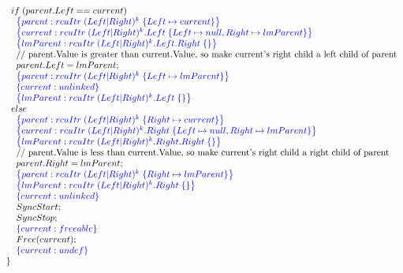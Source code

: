 \[\begin{array}{@{}l@{}}
            \;\;\;\;if\; (parent.Left == current)\\
                \;\;\;\;\;\;\specline{parent:rcuItr\; (Left|Right)^{k} \; \{ Left \mapsto current\} }\\
                \;\;\;\;\;\;\specline{current:rcuItr\; (Left|Right)^{k}.Left \; \{Left\mapsto null, Right\mapsto lmParent\} }\\
                \;\;\;\;\;\;\specline{lmParent:rcuItr\; (Left|Right)^{k}.Left.Right \; \{\} }\\
                \;\;\;\;\;\;\text{// parent.Value is greater than current.Value, so make current's right child a left child of parent}\\
                \;\;\;\;\;\;parent.Left = lmParent;\\
                \;\;\;\;\;\;\specline{parent:rcuItr\; (Left|Right)^{k} \; \{ Left \mapsto lmParent\} }\\
                \;\;\;\;\;\;\specline{current:unlinked }\\
                \;\;\;\;\;\;\specline{lmParent:rcuItr\; (Left|Right)^{k}.Left \; \{\} }\\                 
            \;\;\;\;else\\
                \;\;\;\;\;\;\specline{parent:rcuItr\; (Left|Right)^{k} \; \{ Right \mapsto current\} }\\
                \;\;\;\;\;\;\specline{current:rcuItr\; (Left|Right)^{k}.Right \; \{Left\mapsto null, Right\mapsto lmParent\} }\\
                \;\;\;\;\;\;\specline{lmParent:rcuItr\; (Left|Right)^{k}.Right.Right \; \{\} }\\
                \;\;\;\;\;\;\text{// parent.Value is less than current.Value, so make current's right child a right child of parent}\\
                \;\;\;\;\;\;parent.Right = lmParent;\\
                \;\;\;\;\;\;\specline{parent:rcuItr\; (Left|Right)^{k} \; \{ Right \mapsto lmParent\} }\\
                \;\;\;\;\;\;\specline{lmParent:rcuItr\; (Left|Right)^{k}.Right \; \{\} }\\
                \;\;\;\;\;\;\specline{current:unlinked  }\\
                \;\;\;\;\;\;SyncStart;\\
                \;\;\;\;\;\;SyncStop;\\
                \;\;\;\;\;\;\specline{current:freeable}\\
                \;\;\;\;\;\;Free(current);\\
                \;\;\;\;\;\;\specline{current:undef}\\
       
    \;\;\}\\
\end{array}
\]
